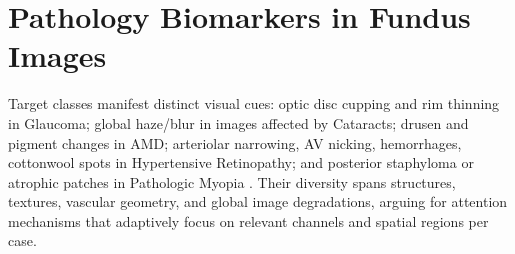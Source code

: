 \section{Pathology Biomarkers in Fundus Images}
Target classes manifest distinct visual cues: optic disc cupping and rim thinning in Glaucoma; global haze/blur in images affected by Cataracts; drusen and pigment changes in AMD; arteriolar narrowing, AV nicking, hemorrhages, cotton\textendash wool spots in Hypertensive Retinopathy; and posterior staphyloma or atrophic patches in Pathologic Myopia \cite{docxRef07,docxRef08,docxRef12,docxRef13,docxRef16,docxRef17,docxRef18}. Their diversity spans structures, textures, vascular geometry, and global image degradations, arguing for attention mechanisms that adaptively focus on relevant channels and spatial regions per case.

